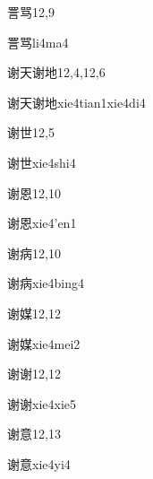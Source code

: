 \begin{entry}{詈骂}{12,9}
  \begin{phonetics}{詈骂}{li4ma4}
  \end{phonetics}
\end{entry}

\begin{entry}{谢天谢地}{12,4,12,6}
  \begin{phonetics}{谢天谢地}{xie4tian1xie4di4}
  \end{phonetics}
\end{entry}

\begin{entry}{谢世}{12,5}
  \begin{phonetics}{谢世}{xie4shi4}
  \end{phonetics}
\end{entry}

\begin{entry}{谢恩}{12,10}
  \begin{phonetics}{谢恩}{xie4'en1}
  \end{phonetics}
\end{entry}

\begin{entry}{谢病}{12,10}
  \begin{phonetics}{谢病}{xie4bing4}
  \end{phonetics}
\end{entry}

\begin{entry}{谢媒}{12,12}
  \begin{phonetics}{谢媒}{xie4mei2}
  \end{phonetics}
\end{entry}

\begin{entry}{谢谢}{12,12}
  \begin{phonetics}{谢谢}{xie4xie5}
  \end{phonetics}
\end{entry}

\begin{entry}{谢意}{12,13}
  \begin{phonetics}{谢意}{xie4yi4}
  \end{phonetics}
\end{entry}

